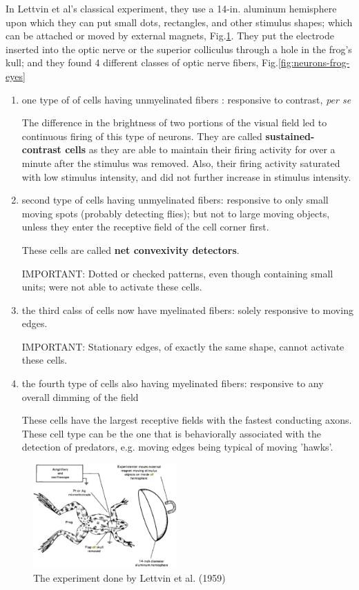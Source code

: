 In Lettvin et al's classical experiment, they use a 14-in. aluminum hemisphere
upon which they can put small dots, rectangles, and other stimulus shapes; which
can be attached or moved by external magnets, Fig.\ref{fig:Lettvin-experiment}.
They put the electrode inserted into the optic nerve or the superior colliculus
through a hole in the frog's kull; and they found 4 different classes of optic
nerve fibers, Fig.\ref{fig:neurons-frog-eyes}
\begin{enumerate}
  \item one type of of cells having unmyelinated fibers : responsive to
  contrast, {\it per se}

The difference in the brightness of two portions of the visual field led to
continuous firing of this type of neurons. They are called {\bf
sustained-contrast cells} as they are able to maintain their firing activity for
over a minute after the stimulus was removed. Also, their firing activity
saturated with low stimulus intensity, and did not further increase in stimulus
intensity.

  \item second type of cells having unmyelinated fibers: responsive to only
  small moving spots (probably detecting flies); but not to large moving
  objects, unless they enter the receptive field of the cell corner first.
  
  These cells are called {\bf net convexivity detectors}.
  
IMPORTANT: Dotted or checked patterns, even though containing small units; were
not able to activate these cells.

  \item the third calss of cells now have myelinated fibers: solely responsive
  to moving edges.
 
IMPORTANT: Stationary edges, of exactly the same shape, cannot activate these
cells. 

  \item the fourth type of cells also having myelinated fibers: responsive to
  any overall dimming of the field
  
  These cells have the largest receptive fields with the fastest conducting
  axons. These cell type can be the one that is behaviorally associated with the
  detection of predators, e.g. moving edges being typical of moving 'hawks'.
\end{enumerate}

\begin{figure}[hbt]
  \centerline{\includegraphics[height=4cm,
    angle=0]{./images/Lettvin-experiment.eps}}    
\caption{The experiment done by Lettvin et al. (1959)}
\label{fig:Lettvin-experiment}
\end{figure}
 

